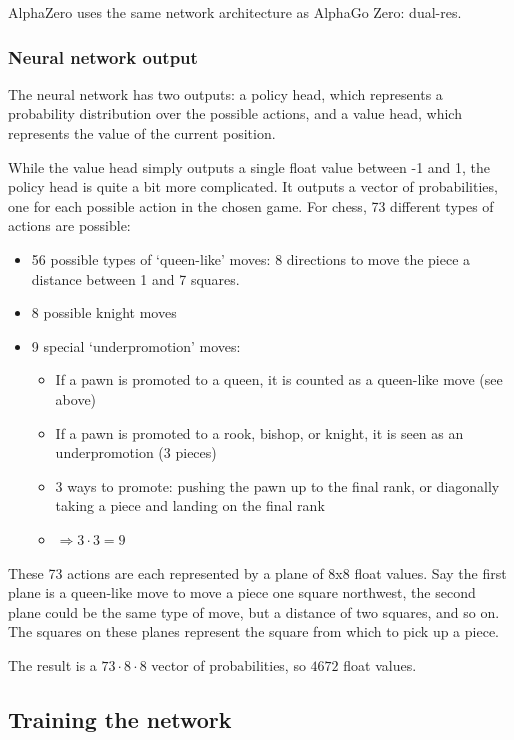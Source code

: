 \documentclass{article}
\begin{document}
AlphaZero uses the same network architecture as AlphaGo Zero: dual-res.

\subsubsection{Neural network output}

The neural network has two outputs: a policy head, which represents a probability distribution over the possible actions, 
and a value head, which represents the value of the current position.

While the value head simply outputs a single float value between -1 and 1, the policy head is quite a bit more complicated.
It outputs a vector of probabilities, one for each possible action in the chosen game. 
For chess, 73 different types of actions are possible:

\begin{itemize}
    \item 56 possible types of `queen-like' moves: 8 directions to move the piece a distance between 1 and 7 squares.
    \item 8 possible knight moves
    \item 9 special `underpromotion' moves:
    \begin{itemize}
        \item If a pawn is promoted to a queen, it is counted as a queen-like move (see above)
        \item If a pawn is promoted to a rook, bishop, or knight, it is seen as an underpromotion (3 pieces)
        \item 3 ways to promote: pushing the pawn up to the final rank, or diagonally taking a piece and landing on the final rank
        \item $\Rightarrow 3 \cdot 3 = 9$
    \end{itemize}
\end{itemize}

These 73 actions are each represented by a plane of 8x8 float values. Say the first plane is a queen-like move
to move a piece one square northwest, the second plane could be the same type of move, but a distance of two squares, and so on.
The squares on these planes represent the square from which to pick up a piece. 


The result is a $73 \cdot 8 \cdot 8$ vector of probabilities, so $4672$ float values.  

\subsection{Training the network}
\end{document}
